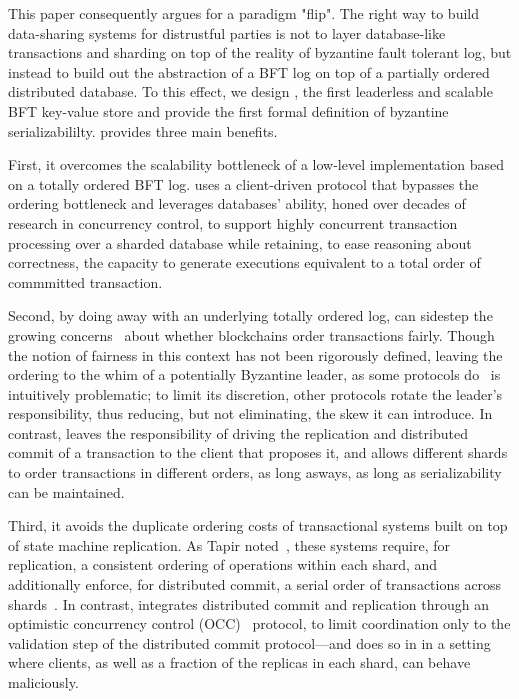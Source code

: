 This paper consequently argues for a paradigm "flip". The right way to build data-sharing systems for distrustful parties is not to layer database-like transactions and sharding on top of the reality of byzantine fault tolerant log, but instead to build out the abstraction of a BFT log on top of a partially ordered distributed database.
To this effect, we design \sys{}, the first leaderless and scalable BFT key-value store
and provide the first formal definition of byzantine serializabililty. \sys{} provides three main benefits.

 First, it overcomes the scalability bottleneck of a low-level
implementation based on a totally ordered BFT log. \sys uses a
client-driven protocol that bypasses the ordering bottleneck and
leverages databases' ability, honed over decades of research in
concurrency control, to support highly concurrent transaction
processing over a sharded database while retaining, to ease reasoning
about correctness, the capacity to generate executions equivalent to a
total order of commmitted transaction.


Second, by doing away with an underlying totally ordered log, \sys{} can
sidestep the growing concerns~\cite{} about whether blockchains
order transactions fairly. Though the notion of fairness in this
context has not been rigorously defined, leaving the ordering to the
whim of a potentially Byzantine leader, as some protocols do~\cite{}
is intuitively problematic; to limit its discretion, other protocols
rotate the leader's responsibility, thus reducing, but not
eliminating, the skew it can introduce. In contrast, \sys leaves the
responsibility of driving the replication and distributed commit of a
transaction to the client that proposes it, and allows different
shards to order transactions in different orders, as long asways, as
long as serializability can be maintained.

Third, it avoids the duplicate ordering costs of transactional systems
built on top of state machine replication. As Tapir noted~\cite{},
these systems require, for replication, a consistent ordering of
operations within each shard, and additionally enforce, for
distributed commit, a serial order of transactions across
shards~\cite{}. In contrast, \sys{} integrates distributed commit and
replication through an optimistic concurrency control (OCC)~\cite{} protocol, to
limit coordination only to the validation step of the distributed commit
protocol---and does so in in a setting where clients, as well as a
fraction of the replicas in each shard, can behave maliciously.


